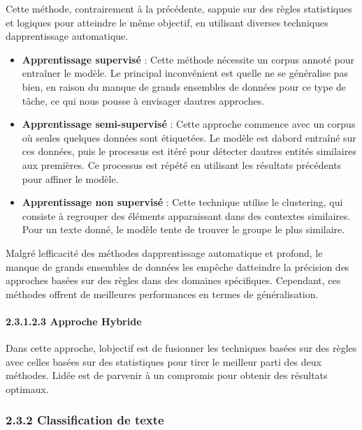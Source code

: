 \documentclass[
]{article}
\begin{document}
Cette méthode, contrairement à la précédente, s\textquotesingle appuie
sur des règles statistiques et logiques pour atteindre le même objectif,
en utilisant diverses techniques d\textquotesingle apprentissage
automatique.

\begin{itemize}
\item
  \textbf{Apprentissage supervisé} : Cette méthode nécessite un corpus
  annoté pour entraîner le modèle. Le principal inconvénient est
  qu\textquotesingle elle ne se généralise pas bien, en raison du manque
  de grands ensembles de données pour ce type de tâche, ce qui nous
  pousse à envisager d\textquotesingle autres approches.
\item
  \textbf{Apprentissage semi-supervisé} : Cette approche commence avec
  un corpus où seules quelques données sont étiquetées. Le modèle est
  d\textquotesingle abord entraîné sur ces données, puis le processus
  est itéré pour détecter d\textquotesingle autres entités similaires
  aux premières. Ce processus est répété en utilisant les résultats
  précédents pour affiner le modèle.
\item
  \textbf{Apprentissage non supervisé} : Cette technique utilise le
  clustering, qui consiste à regrouper des éléments apparaissant dans
  des contextes similaires. Pour un texte donné, le modèle tente de
  trouver le groupe le plus similaire.
\end{itemize}

Malgré l\textquotesingle efficacité des méthodes
d\textquotesingle apprentissage automatique et profond, le manque de
grands ensembles de données les empêche d\textquotesingle atteindre la
précision des approches basées sur des règles dans des domaines
spécifiques. Cependant, ces méthodes offrent de meilleures performances
en termes de généralisation.

\paragraph{2.3.1.2.3 Approche Hybride}\label{approche-hybride}

Dans cette approche, l\textquotesingle objectif est de fusionner les
techniques basées sur des règles avec celles basées sur des statistiques
pour tirer le meilleur parti des deux méthodes. L\textquotesingle idée
est de parvenir à un compromis pour obtenir des résultats optimaux.

\subsubsection{2.3.2 Classification de
texte}\label{classification-de-texte}
\end{document}

